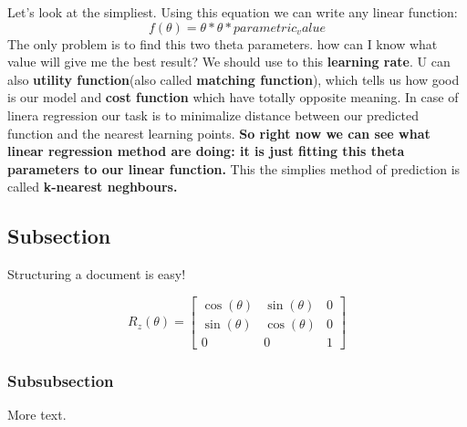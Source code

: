 \documentclass{article}
\begin{document}
  Let's look at the simpliest. Using this equation we can write any linear function:
  \begin{equation*}
    f(\theta) = \theta * \theta * parametric_value
  \end{equation*}
  The only problem is to find this two theta parameters. how can I know what value will give me the best result? We should use to this \textbf{learning rate}. U can also \textbf{utility function}(also called \textbf{matching function}), which tells us how good is our model and \textbf{cost function} which have totally opposite meaning. In case of linera regression our task is to minimalize distance between our predicted function and the nearest learning points. \textbf{So right now we can see what linear regression method are doing: it is just fitting this theta parameters to our linear function.} This the simplies method of prediction is called \textbf{k-nearest neghbours.}
     \newpage

\subsection{Subsection}
































Structuring a document is easy!

\[    %
R_z (\theta)=
\begin{bmatrix}
    \cos(\theta) & \sin(\theta)  & 0 \\
    \sin(\theta) &  \cos(\theta)  & 0 \\
    0            & 0             & 1
\end{bmatrix}
\]    %

\subsubsection{Subsubsection}

More text.
\end{document}
